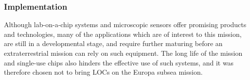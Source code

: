 \subsubsection{Implementation}
Although lab-on-a-chip systems and microscopic sensors offer promising products and technologies, many of the applications which are of interest to this mission, are still in a developmental stage, and require further maturing before an extraterrestrial mission can rely on such equipment. The long life of the mission and single-use chips also hinders the effective use of such systems, and it was therefore chosen not to bring LOCs on the Europa subsea mission.







